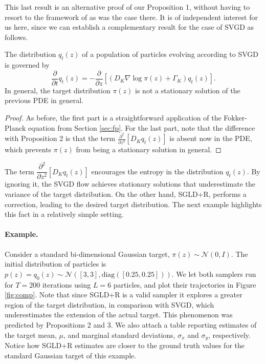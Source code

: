 This last result is an alternative proof of our Proposition 1, without having to resort to the framework of \cite{ma2015complete} as was the case there. It is of independent interest for us here, since we can establish a complementary result for the case of SVGD as follows.
\begin{proposition}
The distribution $q_t({z})$ of a population of particles evolving according to SVGD is governed by
$$
\frac{\partial}{\partial t} q_t({z}) = -\frac{\partial}{\partial {z}} \left[ (D_K \nabla \log \pi({z}) + \Gamma_K) q_t({z})\right] .
$$
In general, the target distribution $\pi({z})$ is not a stationary solution of the previous PDE in general.
\end{proposition}
\begin{proof}
As before, the first part is a straightforward application of the Fokker-Planck equation from Section \ref{sec:fp}. For the last part, note that the difference with Proposition 2 is that the term $\frac{\partial^2}{\partial {z}^2} \left[ D_K q_t({z})  \right]$ is absent now in the PDE, which prevents $\pi({z})$ from being a stationary solution in general.
\end{proof}
The term $\dfrac{\partial^2}{\partial {z}^2} \left[ D_K q_t({z})  \right]$ encourages the entropy in the distribution $q_t({z})$. By ignoring it, the SVGD flow achieves stationary solutions that underestimate the variance of the target distribution. On the other hand, SGLD+R, performs a correction, leading to the desired target distribution. The next example highlights this fact in a relatively simple setting.

\paragraph{Example.} Consider a standard bi-dimensional Gaussian target, $\pi({z}) \sim \mathcal{N}(0, I)$. The initial distribution of particles is $p({z}) = q_0({z}) \sim \mathcal{N}([3,3], \mbox{diag}([0.25, 0.25]))$. We let both samplers run for $T = 200$ iterations using $L = 6$ particles, and plot their trajectories in Figure \ref{fig:comp}. Note that since SGLD+R is a valid sampler it explores a greater region of the target distribution, in comparison with SVGD, which underestimates the extension of the actual target. This phenomenon was predicted by Propositions 2 and 3. We also attach a table reporting estimates of the target mean, $\mu$, and marginal standard deviations, $\sigma_x$ and $\sigma_y$, respectively. Notice how SGLD+R estimates are closer to the ground truth values for the standard Gaussian target of this example.

